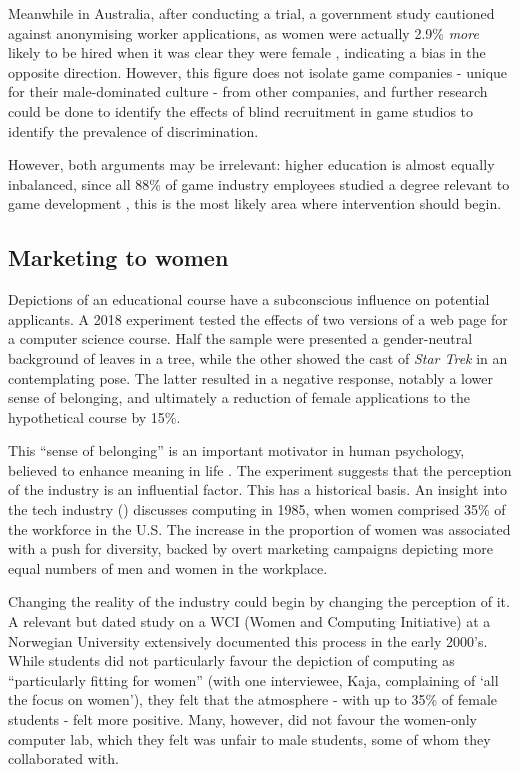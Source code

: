 \documentclass{scrartcl}
\begin{document}
Meanwhile in Australia, after conducting a trial, a government study cautioned against anonymising worker applications, as women were actually 2.9\% \textit{more} likely to be hired when it was clear they were female \cite{noauthor_going_nodate}, indicating a bias in the opposite direction. However, this figure does not isolate game companies - unique for their male-dominated culture - from other companies, and further research could be done to identify the effects of blind recruitment in game studios to identify the prevalence of discrimination.

However, both arguments may be irrelevant: higher education is almost equally inbalanced, since all 88\% of game industry employees studied a degree relevant to game development \cite{igda_satisfaction_2017}, this is the most likely area where intervention should begin.

\subsection{Marketing to women}
Depictions of an educational course have a subconscious influence on potential applicants. A 2018 experiment \cite{Metaxa-Kakavouli:2018:GDS:3173574.3174188} tested the effects of two versions of a web page for a computer science course. Half the sample were presented a gender-neutral background of leaves in a tree, while the other showed the cast of \textit{Star Trek} in an contemplating pose. The latter resulted in a negative response, notably a lower sense of belonging, and ultimately a reduction of female applications to the hypothetical course by 15\%.

This ``sense of belonging'' is an important motivator in human psychology, believed to enhance meaning in life \cite{lambert_belong_2013}. The experiment suggests that the perception of the industry is an influential factor. This has a historical basis. An insight into the tech industry (\cite{vogel_spitting_2017}) discusses computing in 1985, when women comprised 35\% of the workforce in the U.S. The increase in the proportion of women was associated with a push for diversity, backed by overt marketing campaigns depicting more equal numbers of men and women in the workplace.

Changing the reality of the industry could begin by changing the perception of it. A relevant but dated study on a WCI (Women and Computing Initiative) at a Norwegian University \cite{doi:10.1177/0306312706063788} extensively documented this process in the early 2000's. While students did not particularly favour the depiction of computing as ``particularly fitting for women'' (with one interviewee, Kaja, complaining of `all the focus on women'), they felt that the atmosphere - with up to 35\% of female students - felt more positive. Many, however, did not favour the women-only computer lab, which they felt was unfair to male students, some of whom they collaborated with.
\end{document}
